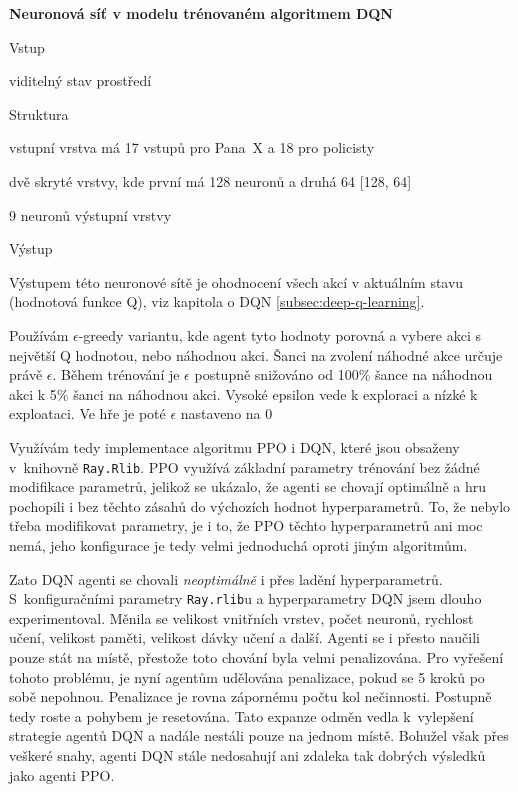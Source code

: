     \textbf{Neuronová síť v modelu trénovaném algoritmem DQN}
    \begin{myitemize}
      \item Vstup
        \begin{myitemize}
          \item viditelný stav prostředí
        \end{myitemize}
      \item Struktura
        \begin{myitemize}
          \item vstupní vrstva má 17 vstupů pro Pana~X a 18 pro policisty
          \item dvě skryté vrstvy, kde první má 128 neuronů a druhá 64 [128, 64]
          \item 9 neuronů výstupní vrstvy
        \end{myitemize}
        \pagebreak
      \item Výstup
        \begin{myitemize}
          \item Výstupem této neuronové sítě je ohodnocení všech akcí v aktuálním stavu (hodnotová funkce Q), viz kapitola o DQN \ref{subsec:deep-q-learning}.
          \item Používám $\epsilon$-greedy variantu, kde agent tyto hodnoty porovná a vybere akci s největší Q hodnotou, nebo náhodnou akci.
          Šanci na zvolení náhodné akce určuje právě $\epsilon$. Během trénování je $\epsilon$ postupně snižováno od 100\% šance na náhodnou akci k 5\% šanci na náhodnou akci.
          Vysoké epsilon vede k exploraci a nízké k exploataci. Ve hře je poté $\epsilon$ nastaveno na 0%
        \end{myitemize}
    \end{myitemize}

  \bigskip

Využívám tedy implementace algoritmu PPO i DQN, které jsou obsaženy v~knihovně \texttt{Ray.Rlib}.
PPO využívá základní parametry trénování bez žádné modifikace parametrů, jelikož se ukázalo, že agenti se chovají optimálně a hru pochopili i bez těchto zásahů do výchozích hodnot hyperparametrů.
To, že nebylo třeba modifikovat parametry, je i to, že PPO těchto hyperparametrů ani moc nemá, jeho konfigurace je tedy velmi jednoduchá oproti jiným algoritmům.

Zato DQN agenti se chovali \emph{neoptimálně} i přes ladění hyperparametrů.
S~konfiguračními parametry \texttt{Ray.rlib}u a hyperparametry DQN jsem dlouho experimentoval.
Měnila se velikost vnitřních vrstev, počet neuronů, rychlost učení, velikost paměti, velikost dávky učení a další.
Agenti se i přesto naučili pouze stát na místě, přestože toto chování byla velmi penalizována.
Pro vyřešení tohoto problému, je nyní agentům udělována penalizace, pokud se 5 kroků po sobě nepohnou.
Penalizace je rovna zápornému počtu kol nečinnosti.
Postupně tedy roste a pohybem je resetována.
Tato expanze odměn vedla k~vylepšení strategie agentů DQN a nadále nestáli pouze na jednom místě.
Bohužel však přes veškeré snahy, agenti DQN stále nedosahují ani zdaleka tak dobrých výsledků jako agenti PPO\@.

